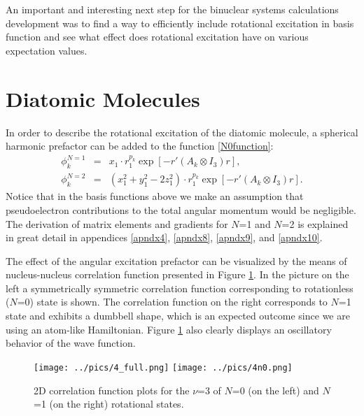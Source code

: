 An important and interesting next step for the binuclear systems calculations
development was to find a way to efficiently include rotational excitation
in basis function and see what effect does rotational excitation have on
various expectation values. 

\section{Diatomic Molecules}

In order to describe the rotational excitation of the diatomic molecule,
a spherical harmonic prefactor can be added to the function \ref{N0function}:
\begin{eqnarray}
\phi_k^{N=1} &=& x_1 \cdot r_1^{p_k} \exp [-r'(A_k \otimes I_3) r], \\
\label{N1function}
\phi_k^{N=2} &=& (x_1^2 + y_1^2 - 2z_1^2) \cdot r_1^{p_k} \exp [-r'(A_k \otimes I_3) r].
\label{N2function}
\end{eqnarray}
Notice that in the basis functions above we make an assumption that 
pseudoelectron contributions to the total angular momentum would be 
negligible. The derivation of matrix elements and gradients for $N$=1
and $N$=2 is explained in great detail in appendices 
\ref{apndx4}, \ref{apndx8}, \ref{apndx9}, and \ref{apndx10}.

The effect of the angular excitation prefactor can be visualized
by the means of nucleus-nucleus correlation function presented 
in Figure \ref{1d}. In the picture on the left a symmetrically
symmetric correlation function corresponding to rotationless ($N$=0)
state is shown. The correlation function on the right corresponds to 
$N$=1 state and exhibits a dumbbell shape, which is an expected outcome
since we are using an atom-like Hamiltonian. Figure \ref{1d} also 
clearly displays an oscillatory behavior of the wave function. 

\begin{figure}[t]
\begin{center}
\texttt{[image: ../pics/4\_full.png]}
\texttt{[image: ../pics/4n0.png]}
\end{center}
\caption{\label{1d}  2D correlation function plots for the 
$\nu$=3 of $N$=0 (on the left) and $N$=1 (on the right) rotational states.}
\end{figure}

